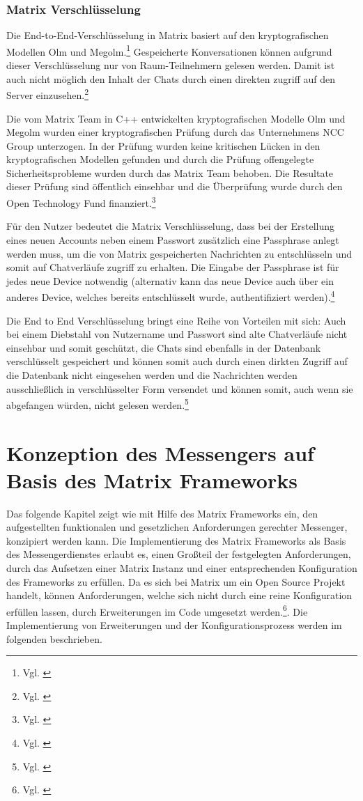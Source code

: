 \subsubsection{Matrix Verschlüsselung}\label{chapter:aemn}
Die End-to-End-Verschlüsselung in Matrix basiert auf den kryptografischen Modellen Olm und Megolm.\footnote{Vgl. \cite{Chishtie2018}}
Gespeicherte Konversationen können aufgrund dieser Verschlüsselung nur von Raum-Teilnehmern gelesen werden. Damit ist auch nicht möglich den Inhalt der Chats durch einen direkten zugriff auf den Server einzusehen.\footnote{Vgl. \cite[S. 1 ff.]{Nccgroup2016}}

Die vom Matrix  Team in C++ entwickelten kryptografischen Modelle Olm und Megolm  wurden einer kryptografischen Prüfung durch das Unternehmens NCC Group unterzogen. In der Prüfung wurden keine kritischen Lücken in den kryptografischen Modellen gefunden und durch die Prüfung offengelegte Sicherheitsprobleme wurden durch das Matrix Team behoben.  Die Resultate dieser Prüfung sind öffentlich einsehbar und die Überprüfung wurde durch den Open Technology Fund finanziert.\footnote{Vgl. \cite[S. 5 ff.]{Nccgroup2016}}

Für den Nutzer bedeutet die Matrix Verschlüsselung, dass bei der Erstellung eines neuen Accounts neben einem Passwort zusätzlich eine Passphrase anlegt werden muss, um die von Matrix gespeicherten Nachrichten zu entschlüsseln und somit auf Chatverläufe zugriff zu erhalten.
Die Eingabe der Passphrase ist für jedes neue Device notwendig (alternativ kann das neue Device auch über ein anderes Device, welches bereits entschlüsselt wurde, authentifiziert werden).\footnote{Vgl. \cite{Chishtie2018}}

Die End to End Verschlüsselung bringt eine Reihe von Vorteilen mit sich: Auch bei einem Diebstahl von Nutzername und Passwort sind alte Chatverläufe nicht einsehbar und somit geschützt, die Chats sind ebenfalls in der Datenbank verschlüsselt gespeichert und können somit auch durch einen dirkten Zugriff auf die Datenbank nicht eingesehen werden und die Nachrichten werden ausschließlich in verschlüsselter Form versendet und können somit, auch wenn sie abgefangen würden, nicht gelesen werden.\footnote{Vgl. \cite{Chishtie2018}}

\section{Konzeption des Messengers auf Basis des Matrix Frameworks}\label{chapter:km}
Das folgende Kapitel zeigt wie mit Hilfe des Matrix Frameworks ein, den aufgestellten funktionalen und gesetzlichen Anforderungen gerechter Messenger, konzipiert werden kann.
Die Implementierung des Matrix Frameworks als Basis des Messengerdienstes erlaubt es, einen Großteil der festgelegten Anforderungen, durch das Aufsetzen einer Matrix Instanz und einer entsprechenden Konfiguration des Frameworks zu erfüllen. Da es sich bei Matrix um ein Open Source Projekt handelt, können Anforderungen, welche sich nicht durch eine reine Konfiguration erfüllen lassen, durch Erweiterungen im Code umgesetzt werden.\footnote{Vgl. \cite{Github2020}}. Die Implementierung von Erweiterungen und der Konfigurationsprozess werden im folgenden beschrieben.

